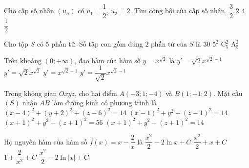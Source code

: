 \begin{ex}%
	Cho cấp số nhân $\left(u_n\right)$ có $u_1=\dfrac{1}{2}$, $u_2=2$. Tìm công bội của cấp số nhân.
	\choice
	{$\dfrac{3}{2}$}
	{$2$}
	{\True $4$}
	{$\dfrac{1}{2}$}
\end{ex}

\begin{ex}%
	Cho tập $S$ có $5$ phần tử. Số tập con gồm đúng $2$ phần tử của $S$ là
	\choice
	{$30$}
	{$5^2$}
	{\True $\mathrm{C}_5^2$}
	{$\mathrm{A}_5^2$}
\end{ex}

\begin{ex}%
	Trên khoảng $(0;+\infty)$, đạo hàm của hàm số $y=x^{\sqrt{2}}$ là
	\choice
	{\True $y'=\sqrt{2}x^{\sqrt{2}-1}$}
	{$y'=\sqrt{2}x^{\sqrt{2}}$}
	{$y'=x^{\sqrt{2}-1}$}
	{$y'=\dfrac{1}{\sqrt{2}}x^{\sqrt{2}-1}$}
\end{ex}

\begin{ex}%
	Trong không gian $Oxyz$, cho hai điểm $A\left(-3;1;-4\right)$ và $B\left(1;-1;2\right)$. Mặt cầu $(S)$ nhận $AB$ làm đường kính có phương trình là
	\choice
	{$\left(x-4\right)^2+\left(y+2\right)^2+\left(z-6\right)^2=14$}
	{$\left(x-1\right)^2+y^2+\left(z-1\right)^2=14$}
	{$\left(x+1\right)^2+y^2+\left(z+1\right)^2=56$}
	{\True $\left(x+1\right)^2+y^2+\left(z+1\right)^2=14$}
\end{ex}

\begin{ex}%
	Họ nguyên hàm của hàm số $f(x)=x-\dfrac{2}{x}$ là
	\choice
	{$\dfrac{x^2}{2}-2\ln x+C$}
	{$\dfrac{x^2}{2}+x+C$}
	{$1+\dfrac{2}{x^2}+C$}
	{\True $\dfrac{x^2}{2}-2\ln\left|x\right|+C$}
\end{ex}

